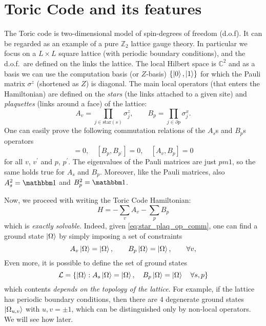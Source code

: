 \section{Toric Code and its features}
\label{sec:toric_code_and_its_features}

The Toric code is two-dimensional model of spin-\onehalf degrees of freedom (d.o.f).
It can be regarded as an example of a pure $\mathbb{Z}_2$ lattice gauge theory.
In particular we focus on a $L \times L$ square lattice (with periodic boundary conditions), and the d.o.f.~are defined on the links the lattice.
The local Hilbert space is $\mathbb{C}^2$ and as a basis we can use the computation basis (or $Z$-basis) $\qty{ \ket{0}, \ket{1} }$ for which the Pauli matrix $\sigma^z$ (shortened as $Z$) is diagonal.
The main local operators (that enters the Hamiltonian) are defined on the \emph{stars} (the links attached to a given site) and \emph{plaquettes} (links around a face) of the lattice:
\begin{equation}
    A_v = \prod_{j \in \text{star}(s)} \sigma^z_j, \qquad
    B_p = \prod_{j \in \partial p} \sigma^x_j.
\end{equation}
One can easily prove the following commutation relations of the $A_s$s and $B_p$s operators
\begin{equation}
    [ A_v, A_{v^{\prime} } ] = 0, \quad
    [ B_p, B_{p^{\prime} } ] = 0, \quad
    [ A_v, B_p ] = 0
    \label{eq:star_plaq_op_comm}
\end{equation}
for all $v$, $v^{\prime} $ and $p$, $p^{\prime} $.
The eigenvalues of the Pauli matrices are just $pm 1$, so the same holds true for $A_s$ and $B_p$.
Moreover, like the Pauli matrices, also $A_s^2 = \identity$ and $B_p^2 = \identity$.


Now, we proceed with writing the Toric Code Hamiltonian:
\begin{equation}
    H = - \sum_{v} A_v - \sum_{p} B_p
    \label{eq:toric_code_hamiltonian}
\end{equation}
which is \emph{exactly solvable}.
Indeed, given \eqref{eq:star_plaq_op_comm}, one can find a ground state $\ket{\Omega}$  by simply imposing a set of constraints
\begin{equation}
    A_v \ket{\Omega} = \ket{\Omega}, \qquad
    B_p \ket{\Omega} = \ket{\Omega}, \qquad \forall v,
    \label{eq:ground_state_constraints}
\end{equation}
Even more, it is possible to define the set of ground states
\begin{equation}
    \mathcal{L} = \qty{ \ket{\Omega} : A_s \ket{\Omega} = \ket{\Omega}, \quad B_p \ket{\Omega} = \ket{\Omega} \quad \forall s, p }
\end{equation}
which contents \emph{depends on the topology of the lattice}.
For example, if the lattice has periodic boundary conditions, then there are $4$ degenerate ground states $\ket{\Omega_{u,v}}$ with $u, v = \pm 1$, which can be distinguished only by non-local operators.
We will see how later.

